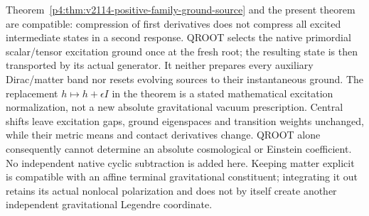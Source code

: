 \documentclass[12pt,a4paper]{article}
\begin{document}
\begin{remark}
\label{p4:rem:v2216-qroot-dynamic-scope}
Theorem~\ref{p4:thm:v2114-positive-family-ground-source} and the present
theorem are compatible: compression of first derivatives does not compress
all excited intermediate states in a second response. QROOT selects the
native primordial scalar/tensor excitation ground once at the fresh root;
the resulting state is then transported by its actual generator. It neither
prepares every auxiliary Dirac/matter band nor resets evolving sources to
their instantaneous ground. The replacement $h\mapsto h+\epsilon I$ in
the theorem is a stated mathematical excitation normalization, not a new
absolute gravitational vacuum prescription. Central shifts leave excitation
gaps, ground eigenspaces and transition weights unchanged, while their metric
means and contact derivatives change. QROOT alone consequently cannot
determine an absolute cosmological or Einstein coefficient. No independent
native cyclic subtraction is added here. Keeping matter explicit is
compatible with an affine terminal gravitational constituent; integrating
it out retains its actual nonlocal polarization and does not by itself
create another independent gravitational Legendre coordinate.
\end{remark}
\end{document}
